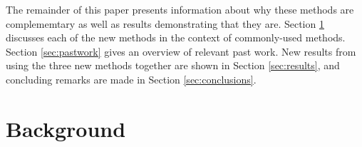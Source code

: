 \documentclass[preprint,12pt]{elsarticle}
\newcommand{\Sn}{\ensuremath{S_N}}
\newcommand{\Macro}{\ensuremath{\Sigma}}
\begin{document}
The remainder of this paper presents information about why these methods are complememtary as well as results demonstrating that they are. Section \ref{sec:background} discusses each of the new methods in the context of commonly-used methods. Section \ref{sec:pastwork} gives an overview of relevant past work. New results from using the three new methods together are shown in Section \ref{sec:results}, and concluding remarks are made in Section \ref{sec:conclusions}.

\section{Background}
\label{sec:background}
% 
\end{document}
